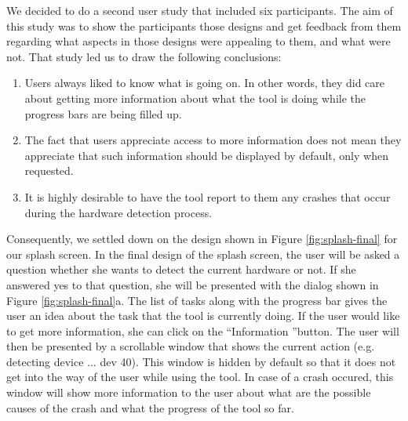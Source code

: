 \documentclass{chi2009}
\begin{document}
We decided to do a second user study that included six participants. The aim of this study was to show the participants those designs and get feedback from
them regarding what aspects in those designs were appealing to them, and what were not. That study led us to draw the following conclusions:
\begin{enumerate}
 \item Users always liked to know what is going on. In other words, they did care about getting more information about what the tool is doing while the progress
bars are being filled up.
 \item The fact that users appreciate access to more information does not mean they appreciate that such information should be displayed by default, only when
requested.
 \item It is highly desirable to have the tool report to them any crashes that occur during the hardware detection process.
\end{enumerate}

Consequently, we settled down on the design shown in Figure \ref{fig:splash-final} for our splash screen. In the final design of the splash screen, the user
will be asked a question whether she wants to detect the current hardware or not. If she answered yes to that question, she will be presented with the dialog
shown in Figure \ref{fig:splash-final}a. The list of tasks along with the progress bar gives the user an idea about the task that the tool is currently doing.
If the user would like to get more information, she can click on the \textquotedblleft Information \textquotedblright button. The user will then be presented
by a scrollable window that shows the current action (e.g. detecting device ... dev 40). This window is hidden by default so that it does not get into the way
of the user while using the tool. In case of a crash occured, this window will show more information to the user about what are the possible causes of the crash
and what the progress of the tool so far.
\end{document}
